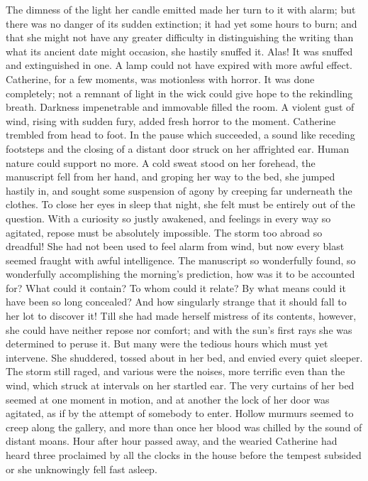  The dimness of the light her candle emitted made her turn to it with alarm; but there was no danger of its sudden extinction; it had yet some hours to burn; and that she might not have any greater difficulty in distinguishing the writing than what its ancient date might occasion, she hastily snuffed it. Alas! It was snuffed and extinguished in one. A lamp could not have expired with more awful effect. Catherine, for a few moments, was motionless with horror. It was done completely; not a remnant of light in the wick could give hope to the rekindling breath. Darkness impenetrable and immovable filled the room. A violent gust of wind, rising with sudden fury, added fresh horror to the moment. Catherine trembled from head to foot. In the pause which succeeded, a sound like receding footsteps and the closing of a distant door struck on her affrighted ear. Human nature could support no more. A cold sweat stood on her forehead, the manuscript fell from her hand, and groping her way to the bed, she jumped hastily in, and sought some suspension of agony by creeping far underneath the clothes. To close her eyes in sleep that night, she felt must be entirely out of the question. With a curiosity so justly awakened, and feelings in every way so agitated, repose must be absolutely impossible. The storm too abroad so dreadful! She had not been used to feel alarm from wind, but now every blast seemed fraught with awful intelligence. The manuscript so wonderfully found, so wonderfully accomplishing the morning's prediction, how was it to be accounted for? What could it contain? To whom could it relate? By what means could it have been so long concealed? And how singularly strange that it should fall to her lot to discover it! Till she had made herself mistress of its contents, however, she could have neither repose nor comfort; and with the sun's first rays she was determined to peruse it. But many were the tedious hours which must yet intervene. She shuddered, tossed about in her bed, and envied every quiet sleeper. The storm still raged, and various were the noises, more terrific even than the wind, which struck at intervals on her startled ear. The very curtains of her bed seemed at one moment in motion, and at another the lock of her door was agitated, as if by the attempt of somebody to enter. Hollow murmurs seemed to creep along the gallery, and more than once her blood was chilled by the sound of distant moans. Hour after hour passed away, and the wearied Catherine had heard three proclaimed by all the clocks in the house before the tempest subsided or she unknowingly fell fast asleep. 
